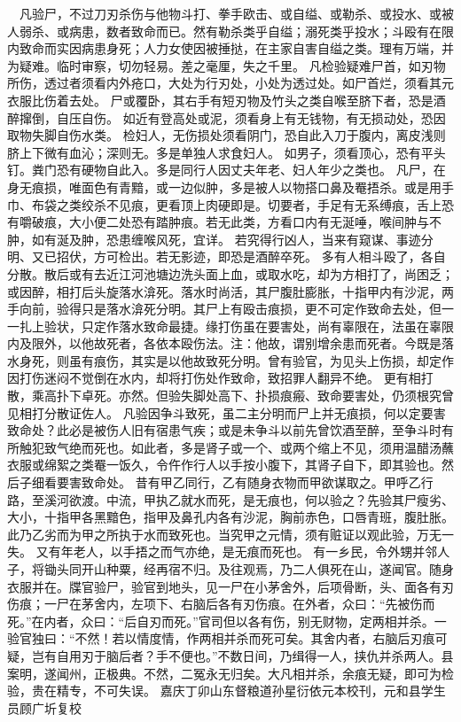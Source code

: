 \documentclass[12pt,UTF8]{ctexbook}
\begin{document}
　凡验尸，不过刀刃杀伤与他物斗打、拳手欧击、或自缢、或勒杀、或投水、或被人弱杀、或病患，数者致命而已。然有勒杀类乎自缢；溺死类乎投水；斗殴有在限内致命而实因病患身死；人力女使因被捶挞，在主家自害自缢之类。理有万端，并为疑难。临时审察，切勿轻易。差之毫厘，失之千里。
凡检验疑难尸首，如刃物所伤，透过者须看内外疮口，大处为行刃处，小处为透过处。如尸首烂，须看其元衣服比伤着去处。
尸或覆卧，其右手有短刃物及竹头之类自喉至脐下者，恐是酒醉撺倒，自压自伤。
如近有登高处或泥，须看身上有无钱物，有无损动处，恐因取物失脚自伤水类。
检妇人，无伤损处须看阴门，恐自此入刀于腹内，离皮浅则脐上下微有血沁；深则无。多是单独人求食妇人。
如男子，须看顶心，恐有平头钉。粪门恐有硬物自此入。多是同行人因丈夫年老、妇人年少之类也。
凡尸，在身无痕损，唯面色有青黯，或一边似肿，多是被人以物搭口鼻及罨捂杀。或是用手巾、布袋之类绞杀不见痕，更看顶上肉硬即是。切要者，手足有无系缚痕，舌上恐有嚼破痕，大小便二处恐有踏肿痕。若无此类，方看口内有无涎唾，喉间肿与不肿，如有涎及肿，恐患缠喉风死，宜详。
若究得行凶人，当来有窥谋、事迹分明、又已招伏，方可检出。若无影迹，即恐是酒醉卒死。
多有人相斗殴了，各自分散。散后或有去近江河池塘边洗头面上血，或取水吃，却为方相打了，尚困乏；或因醉，相打后头旋落水渰死。落水时尚活，其尸腹肚膨胀，十指甲内有沙泥，两手向前，验得只是落水渰死分明。其尸上有殴击痕损，更不可定作致命去处，但一一扎上验状，只定作落水致命最捷。缘打伤虽在要害处，尚有辜限在，法虽在辜限内及限外，以他故死者，各依本殴伤法。注：他故，谓别增余患而死者。今既是落水身死，则虽有痕伤，其实是以他故致死分明。曾有验官，为见头上伤损，却定作因打伤迷闷不觉倒在水内，却将打伤处作致命，致招罪人翻异不绝。
更有相打散，乘高扑下卓死。亦然。但验失脚处高下、扑损痕瘢、致命要害处，仍须根究曾见相打分散证佐人。
凡验因争斗致死，虽二主分明而尸上并无痕损，何以定要害致命处？此必是被伤人旧有宿患气疾；或是未争斗以前先曾饮酒至醉，至争斗时有所触犯致气绝而死也。如此者，多是肾子或一个、或两个缩上不见，须用温醋汤蘸衣服或绵絮之类罨一饭久，令仵作行人以手按小腹下，其肾子自下，即其验也。然后子细看要害致命处。
昔有甲乙同行，乙有随身衣物而甲欲谋取之。甲呼乙行路，至溪河欲渡。中流，甲执乙就水而死，是无痕也，何以验之？先验其尸瘦劣、大小，十指甲各黑黯色，指甲及鼻孔内各有沙泥，胸前赤色，口唇青班，腹肚胀。此乃乙劣而为甲之所执于水而致死也。当究甲之元情，须有赃证以观此验，万无一失。
又有年老人，以手捂之而气亦绝，是无痕而死也。
有一乡民，令外甥并邻人子，将锄头同开山种粟，经再宿不归。及往观焉，乃二人俱死在山，遂闻官。随身衣服并在。牒官验尸，验官到地头，见一尸在小茅舍外，后项骨断，头、面各有刃伤痕；一尸在茅舍内，左项下、右脑后各有刃伤痕。在外者，众曰：“先被伤而死。”在内者，众曰：“后自刃而死。”官司但以各有伤，别无财物，定两相并杀。一验官独曰：“不然！若以情度情，作两相并杀而死可矣。其舍内者，右脑后刃痕可疑，岂有自用刃于脑后者？手不便也。”不数日间，乃缉得一人，挟仇并杀两人。县案明，遂闻州，正极典。不然，二冤永无归矣。大凡相并杀，余痕无疑，即可为检验，贵在精专，不可失误。
嘉庆丁卯山东督粮道孙星衍依元本校刊，元和县学生员顾广圻复校
\end{document}
